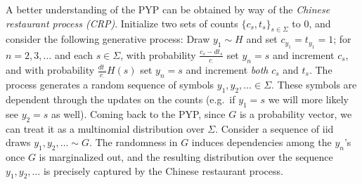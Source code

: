 A better understanding of the PYP can be obtained by way of the \emph{Chinese
restaurant process (CRP)}.  Initialize two sets of counts $\{c_s,t_s\}_{s\in\Sigma}$
to 0, and consider the following generative process: Draw $y_1\sim H$ and set $c_{y_1}=t_{y_1}=1$; for $n=2,3,\ldots$ and
each $s\in\Sigma$, with probability $\frac{c_s-dt_s}{c_\cdot}$ set $y_n=s$ and
increment $c_s$, and with probability $\frac{dt_\cdot}{c_\cdot}H(s)$ set
$y_n=s$ and increment \emph{both} $c_s$ and $t_s$.  The process generates a
random sequence of symbols $y_1,y_2,\ldots\in\Sigma$.  These symbols are dependent through the updates on the counts (e.g.\ if $y_1=s$ we will more likely see $y_2=s$ as well).  Coming back to the PYP,
since $G$ is a probability vector, we can treat it as a multinomial
distribution over $\Sigma$.  Consider a sequence of iid draws
$y_1,y_2,\ldots\sim G$.  The randomness in $G$ induces dependencies among the
$y_n$'s once $G$ is marginalized out, and the resulting distribution over the
sequence $y_1,y_2,\ldots$ is precisely captured by the Chinese restaurant
process.




